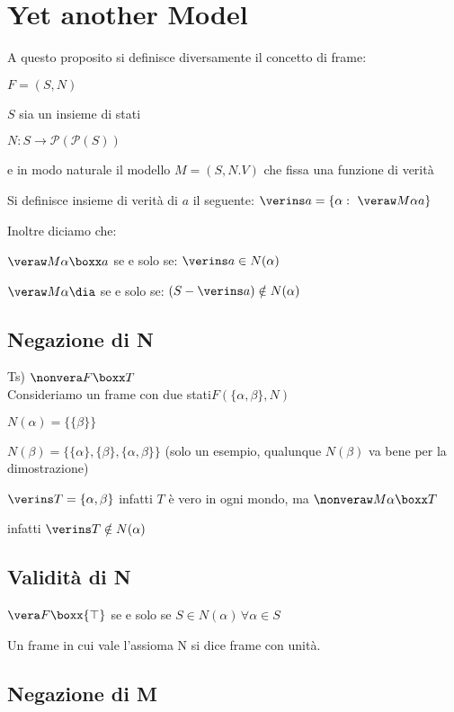 \section{Yet another Model}

A questo proposito si definisce diversamente il concetto di frame:

$F=(S,N)$ 

$S$ sia un insieme di stati 

$N:S\rightarrow\mathcal{P}(\mathcal{P}(S))$

e in modo naturale il modello $M=(S,N.V)$ che fissa una funzione
di verità

Si definisce insieme di verità di $a$ il seguente: $\verins a=\{\alpha:\ \veraw M{\alpha}{a\}}$

Inoltre diciamo che:

$\veraw M{\alpha}{\boxx a}$ se e solo se: $\verins a\in N(\alpha)$	

$\veraw M{\alpha}{\dia}$ se e solo se: $(S-\verins a)\notin N(\alpha)$	


\subsection{Negazione di N}

Ts) $\nonvera F{\boxx T}$\\


Consideriamo un frame con due stati$F(\{\alpha,\beta\},N)$

$N(\alpha)=\{\{\beta\}\}$

$N(\beta)=\{\{\alpha\},\{\beta\},\{\alpha,\beta\}\}$ (solo un esempio,
qualunque $N(\beta)$ va bene per la dimostrazione)

$\verins T=\{\alpha,\beta\}$ infatti $T$ è vero in ogni mondo, ma
$\nonveraw M{\alpha}{\boxx T}$ 

infatti $\verins T\notin N(\alpha)$


\subsection{Validità di N}

$\vera F{\boxx{\top}}$ se e solo se $S\in N(\alpha)\,\forall\alpha\in S$

Un frame in cui vale l'assioma N si dice frame con unità.


\subsection{Negazione di M}

